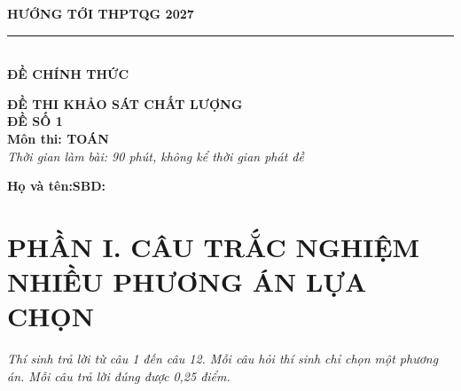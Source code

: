 \documentclass[12pt,a4paper]{article}
\begin{document}
\noindent
\begin{minipage}[t]{0.40\textwidth}
    \centering
    \textbf{HƯỚNG TỚI THPTQG 2027}\\[-2pt]
    \rule{3.2cm}{0.6pt}\\[4pt]
    \textbf{ĐỀ CHÍNH THỨC}
\end{minipage}\hfill
\begin{minipage}[t]{0.58\textwidth}
    \centering
    \textbf{ĐỀ THI KHẢO SÁT CHẤT LƯỢNG}\\
    \textbf{ĐỀ SỐ 1}\\
    \textbf{Môn thi: TOÁN}\\
    \textit{\small Thời gian làm bài: 90 phút, không kể thời gian phát đề}
\end{minipage}

\vspace{0.2cm}
\noindent
\begin{minipage}[b]{0.78\textwidth}
    \textbf{Họ và tên:}\dotfill\textbf{SBD:}\makebox[3.5cm]{\dotfill}
\end{minipage}\hfill
\begin{minipage}[b]{0.20\textwidth}
    \hfill
    \setlength{\fboxrule}{0.8pt}%
\end{minipage}
\vspace{0.2cm}

\section*{\large PHẦN I. CÂU TRẮC NGHIỆM NHIỀU PHƯƠNG ÁN LỰA CHỌN}
\textit{Thí sinh trả lời từ câu 1 đến câu 12. Mỗi câu hỏi thí sinh chỉ chọn một phương án. Mỗi câu trả lời đúng được 0,25 điểm.}
\end{document}
